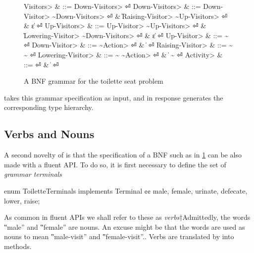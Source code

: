 \begin{figure}
    \begin{Grammar}
      \begin{aligned}
        \<Visitors>         & ::= \<Down-Visitors> \hfill⏎
        \<Down-Visitors>    & ::= \<Down-Visitor> \~\<Down-Visitors> \hfill⏎
        {}                  & \| \<Raising-Visitor> \~\<Up-Visitors> \hfill⏎
        {}                  & \| ε \hfill⏎
        \<Up-Visitors>      & ::= \<Up-Visitor> \~\<Up-Visitors> \hfill⏎
        {}                  & \| \<Lowering-Visitor> \~\<Down-Visitors> \hfill⏎
        {}                  & \| ε \hfill⏎
        \<Up-Visitor>       & ::=  \~ \hfill⏎
        \<Down-Visitor>     & ::=  \~\<Action> \hfill⏎
                            & \|   \hfill⏎
        \<Raising-Visitor>  & ::=  \~ \~ \hfill⏎
        \<Lowering-Visitor> & ::=  \~ \~\<Action> \hfill⏎
                            & \|  \~  \hfill⏎
        \<Activity>         & ::=  \hfill⏎
                            & \|  \hfill⏎
      \end{aligned}
    \end{Grammar}
  \caption{A BNF grammar for the toilette seat problem}
  \label{Figure:BNF}
\end{figure}

\Self takes this grammar specification as input, and in response
  generates the corresponding
  \Java type hierarchy.

\subsection{Verbs and Nouns}
A second novelty of \Self is that the specification of a BNF such as in 
  \cref{Figure:BNF} can be also made with a \Java fluent API\@.
To do so, it is first necessary to
  define the set of \emph{grammar terminals}
  \begin{JAVA}
enum ToiletteTerminals implements Terminal {¢¢
  male, female,
  urinate, defecate,
  lower, raise;
}
\end{JAVA}
As common in fluent APIs we shall refer to these
as \emph{verbs}†{Admittedly, the words ‟male” and ‟female” are nouns. 
  An excuse might be that the words are used as nouns to mean ‟male-visit” and ‟female-visit”.}.
Verbs are translated by \Self into methods.


